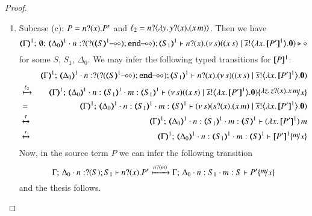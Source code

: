 \begin{proof}
\begin{enumerate}[1.]
	\item	Subcase (c): $P = n ? (x) . P'$ and $\ell_2 = n ? \langle \lambda y.\,y ? (x) . (x\, {m}) \rangle$.
		Then we have
%
		\[
			\mapt{\Gamma}^{1};\, \emptyset;\, \mapt{\Delta_0}^{1} \cat 
			n: \btinp{\lhot{\btinp{\lhot{\tmap{S}{1}}}\tinact}} \tmap{S_1}{1}
			\proves
			\binp{n}{x} \newsp{s}{(\appl{x}{s})
			\Par 
			\bbout{\dual{s}}{\abs{x}{\pmap{P'}{1}}} \inact}
			\hastype \Proc
		\]
%
		for some $S$, $S_1$, $\Delta_0$.
		We may infer the following typed transitions for $[\!\![P]\!\!]^1$:
%
		\begin{eqnarray*}
			& & 
			\mapt{\Gamma}^{1};\, %
			\mapt{\Delta_0}^{1} \cat 
			n: \btinp{\lhot{\btinp{\lhot{\tmap{S}{1}}}\tinact}} \tmap{S_1}{1}
			\proves
			\binp{n}{x} \newsp{s}{(\appl{x}{s}) 
							\Par 
							\bbout{\dual{s}}{\abs{x}{\pmap{P'}{1}}} \inact} \\
			& \hby{\ell_2} & 
			\mapt{\Gamma}^{1};\, %
			\mapt{\Delta_0}^{1} \cat 
			n:\tmap{S_1}{1}
			\cat m:\tmap{S_1}{1}
			\proves
			\newsp{s}{(\appl{x}{s}) 
				\Par 
				\bbout{\dual{s}}{\abs{x}{\pmap{P'}{1}}} \inact} \subst{\abs{z}\binp{z}{x}\appl{x}{m}}{x} \\
			& = & 
			\mapt{\Gamma}^{1};\, %
			\mapt{\Delta_0}^{1} 
			\cat n:\tmap{S_1}{1}
			\cat m:\tmap{S}{1}
			\proves
			\newsp{s}{\binp{s}{x}(\appl{x}{m}) 
				\Par 
				\bbout{\dual{s}}{\abs{x}{\pmap{P'}{1}}} \inact}  \\
			& \hby{\tau} & 
			\mapt{\Gamma}^{1};\, %
			\mapt{\Delta_0}^{1} 
			\cat n:\tmap{S_1}{1}
			\cat m:\tmap{S}{1}
			\proves
			\appl{(\abs{x}{\pmap{P'}{1}})}{m}   \\
			& \hby{\tau} & 
			\mapt{\Gamma}^{1};\, %
			\mapt{\Delta_0}^{1} 
			\cat n:\tmap{S_1}{1}
			\cat m:\tmap{S}{1}
			\proves
			\pmap{P'}{1}\subst{m}{x}   
		\end{eqnarray*}
%
		Now, in the source term $P$ we can infer the following transition 
%
		\[
			\Gamma;\,  \Delta_0 \cat n:\btinp{S} S_1 \proves \binp{n}{x} P'
			\hby{\bactinp{n}{m}} 
			\Gamma;\,  \Delta_0 \cat n: S_1 \cat m: S \proves P'\subst{m}{x}
		\]
%
		and the thesis follows.

%
\end{enumerate}
\end{proof}


